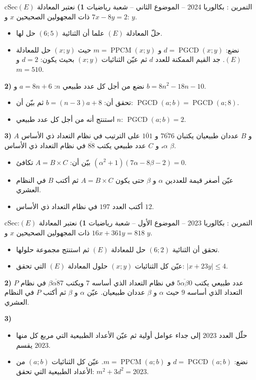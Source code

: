 \documentclass[12pt,a4paper]{article}
\newenvironment{BOX}[2]{\begin{otherlanguage}{english}\begin{arbox}{#1}{#2}}{\end{arbox}\end{otherlanguage}}
\newcounter{exo}
\newenvironment{tamrin}[1]{\stepcounter{exo}\begin{BOX}{cSec}{التمرين \theexo: #1}}{\end{BOX}}
\newcommand{\pgcd}{\operatorname{PGCD}}
\newcommand{\ppcm}{\operatorname{PPCM}}
\newenvironment{sq}{\begin{itemize}[leftmargin=2.4em,itemsep=3pt]}{\end{itemize}}
\newcommand{\qa}{\item[(أ)]}\newcommand{\qb}{\item[(ب)]}\newcommand{\qc}{\item[(جـ)]}\newcommand{\qd}{\item[(د)]}\newcommand{\qe}{\item[(هـ)]}
\begin{document}
\begin{tamrin}{بكالوريا 2024 -- الموضوع الثاني -- شعبة رياضيات}
\textbf{1)} نعتبر المعادلة $(E)$:\quad $7x-8y=2$ ذات المجهولين الصحيحين $x$ و $y$.
\begin{sq}
\qa حلّ المعادلة $(E)$ علما أن الثنائية $(6;5)$ حل لها.
\qb نضع: $d=\pgcd(x;y)$ و $m=\ppcm(x;y)$ حيث $(x;y)$ حل للمعادلة $(E)$.
جد القيم الممكنة للعدد $d$ ثم عيّن الثنائيات $(x;y)$ بحيث يكون: $d=2$ و $m=510$.
\end{sq}
\textbf{2)} نضع من أجل كل عدد طبيعي $n$: $a=8n+6$ و $b=8n^2-18n-10$.
\begin{sq}
\qa تحقق أن: $b=(n-3)a+8$ ثم بيّن أن: $\pgcd(a;b)=\pgcd(a;8)$.
\qb استنتج أنه من أجل كل عدد طبيعي $n$: $\pgcd(a;b)=2$.
\end{sq}
\textbf{3)} $A$ و $B$ عددان طبيعيان يكتبان $\overline{7676}$ و $\overline{101}$ على الترتيب في نظام التعداد ذي الأساس $\alpha$، و $C$ عدد طبيعي يكتب $\overline{88}$ في نظام التعداد ذي الأساس $\beta$.
\begin{sq}
\qa بيّن أن: $A=B\times C$ تكافئ $(\alpha^2+1)(7\alpha-8\beta-2)=0$.
\qb عيّن أصغر قيمة للعددين $\alpha$ و $\beta$ حتى يكون $A=B\times C$ ثم أكتب $B$ في النظام العشري.
\qc أكتب العدد $197$ في نظام التعداد ذي الأساس $12$.
\end{sq}
\end{tamrin}

\begin{tamrin}{بكالوريا 2023 -- الموضوع الأول -- شعبة رياضيات}
\textbf{1)} نعتبر المعادلة $(E)$:\quad $16x+361y=818$ ذات المجهولين الصحيحين $x$ و $y$.
\begin{sq}
\qa تحقق أن الثنائية $(6;2)$ حل للمعادلة $(E)$ ثم استنتج مجموعة حلولها.
\qb عيّن كل الثنائيات $(x;y)$ حلول المعادلة $(E)$ التي تحقق: $|x+23y|\le4$.
\end{sq}
\textbf{2)} $P$ عدد طبيعي يكتب $\overline{5\alpha\beta0}$ في نظام التعداد الذي أساسه $7$ ويكتب $\overline{\beta\alpha87}$ في نظام التعداد الذي أساسه $9$ حيث $\alpha$ و $\beta$ عددان طبيعيان.
عيّن $\alpha$ و $\beta$ ثم أكتب $P$ في النظام العشري.

\textbf{3)}
\begin{sq}
\qa حلّل العدد $2023$ إلى جداء عوامل أولية ثم عيّن الأعداد الطبيعية التي مربع كل منها يقسم $2023$.
\qb نضع: $d=\pgcd(a;b)$ و $m=\ppcm(a;b)$.
عيّن كل الثنائيات $(a;b)$ من الأعداد الطبيعية التي تحقق: $m^2+3d^2=2023$.
\end{sq}
\end{tamrin}
\end{document}
